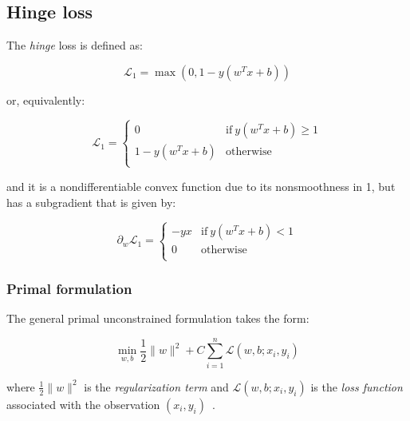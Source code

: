 \pagebreak

\subsection{Hinge loss}

The \emph{hinge} loss is defined as:

\begin{equation} \label{eq:hinge_loss1}
	\mathcal{L}_1 = \max(0, 1 - y (w^T x + b))
\end{equation}

or, equivalently:

\begin{equation} \label{eq:hinge_loss2}
	\mathcal{L}_1 = 
	\begin{cases}
		0 & \text{if} \ y (w^T x + b) \geq 1 \\
		1 - y (w^T x + b) & \text{otherwise} \\
	\end{cases}
\end{equation}

and it is a nondifferentiable convex function due to its nonsmoothness in 1, but has a subgradient that is given by:

\begin{equation} \label{eq:hinge_loss_der}
    \partial_w \mathcal{L}_1=
        \begin{cases}
            -y x & \text{if} \ y (w^T x + b) < 1 \\
            0 & \text{otherwise} \\ 
        \end{cases}
\end{equation}

\subsubsection{Primal formulation}

The general primal unconstrained formulation takes the form:

\begin{equation} \label{eq:primal_svm}
    \min_{w,b} \frac{1}{2} \| w \|^2 + C \sum_{i=1}^n \mathcal{L}(w,b;x_i,y_i)
\end{equation}

where $\displaystyle \frac{1}{2} \| w \|^2$ is the \emph{regularization term} and $\mathcal{L}(w,b;x_i,y_i)$ is the \emph{loss function} associated with the observation $(x_i,y_i)$~\cite{piccialli2018nonlinear}.

